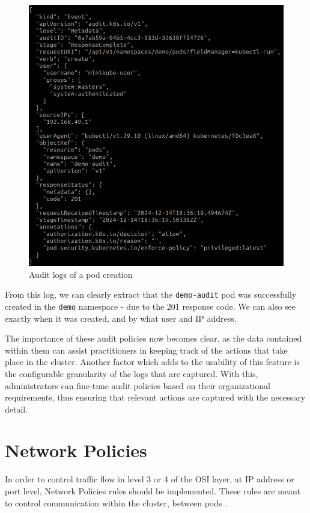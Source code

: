 \documentclass[a4paper,11pt,openright,BCOR=15mm]{scrbook}
\begin{document}
\begin{figure}[h!]
	\centering
	\includegraphics[scale=0.4]{figs/audit-pod-create.png}
	\caption{Audit logs of a pod creation}
	\label{fig:audit-pod}
\end{figure}

From this log, we can clearly extract that the \texttt{demo-audit} pod was successfully created in the \texttt{demo} namespace - due to the 201 response code. We can also see exactly when it was created, and by what user and IP address.

The importance of these audit policies now becomes clear, as the data contained within them can assist practitioners in keeping track of the actions that take place in the cluster. Another factor which adds to the usability of this feature is the configurable granularity of the logs that are captured. With this, administrators can fine-tune audit policies based on their organizational requirements, thus ensuring that relevant actions are captured with the necessary detail.

	\section{Network Policies}
	
In order to control traffic flow in level 3 or 4 of the OSI layer, at IP address or port level, Network Policies rules should be implemented. These rules are meant to control communication within the cluster, between pods \cite{network_policies_kubernetes_from_kubernetes_io}. 
\end{document}
